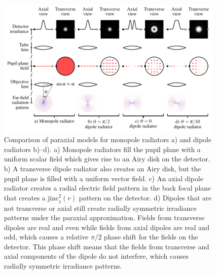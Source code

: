 \documentclass[]{osa-article}
\begin{document}
\begin{figure}[ht]
 \centering
   \centering
   \includegraphics[scale=0.8]{../figures/microscope/microscope.pdf}
   \caption{Comparison of paraxial models for monopole radiators a) and dipole
     radiators b)--d). a) Monopole radiators fill the pupil plane with a uniform
     scalar field which gives rise to an Airy disk on the detector. b) A
     transverse dipole radiator also creates an Airy disk, but the pupil plane
     is filled with a uniform vector field. c) An axial dipole radiator creates
     a radial electric field pattern in the back focal plane that creates a
     $\text{jinc}_1^2(r)$ pattern on the detector. d) Dipoles that are not
     transverse or axial still create radially symmetric irradiance patterns
     under the paraxial approximation. Fields from transverse dipoles are real
     and even while fields from axial dipoles are real and odd, which causes a
     relative $\pi/2$ phase shift for the fields on the detector. This phase
     shift means that the fields from transverse and axial components of the
     dipole do not interfere, which causes radially symmetric irradiance
     patterns.}
   \label{fig:microscopefig}
 \end{figure}
\end{document}

